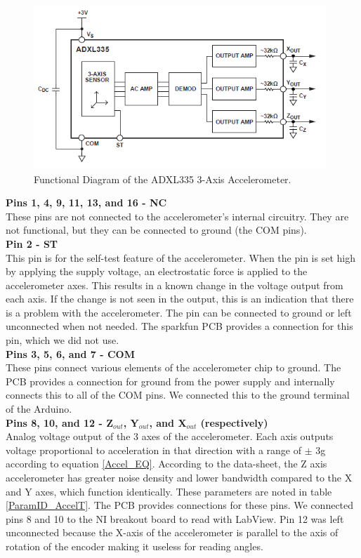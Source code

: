\documentclass{article}
\theoremstyle{plain}
\theoremstyle{definition}
\theoremstyle{remark}
\begin{document}
\begin{figure}[hbt]
\begin{center}
\includegraphics[width = 11cm]{ADXL335Functional.png}
\caption{Functional Diagram of the ADXL335 3-Axis Accelerometer.}
\label{accelFunc}
\end{center}
\end{figure}

\textbf{Pins 1, 4, 9, 11, 13, and 16 - NC}\\
These pins are not connected to the accelerometer's internal circuitry. They are not functional, but they can be connected to ground (the COM pins).\\

\textbf{ Pin 2 - ST}\\
This pin is for the self-test feature of the accelerometer. When the pin is set high by applying the supply voltage, an electrostatic force is applied to the accelerometer axes. This results in a known change in the voltage output from each axis. If the change is not seen in the output, this is an indication that there is a problem with the accelerometer. The pin can be connected to ground or left unconnected when not needed. The sparkfun PCB provides a connection for this pin, which we did not use.\\

\textbf{Pins 3, 5, 6, and 7 - COM}\\
These pins connect various elements of the accelerometer chip to ground. The PCB provides a connection for ground from the power supply and internally connects this to all of the COM pins. We connected this to the ground terminal of the Arduino.\\

\textbf{Pins 8, 10, and 12 - Z$_{out}$, Y$_{out}$, and X$_{out}$ (respectively)}\\ 
Analog voltage output of the 3 axes of the accelerometer. Each axis outputs voltage proportional to acceleration in that direction with a range of $\pm$ 3g according to equation \ref{Accel_EQ}.  According to the data-sheet, the Z axis accelerometer has greater noise density and lower bandwidth compared to the X and Y axes, which function identically. These parameters are noted in table \ref{ParamID_AccelT}.  The PCB provides connections for these pins. We connected pins 8 and 10 to the NI breakout board to read with LabView.  Pin 12 was left unconnected because the X-axis of the accelerometer is parallel to the axis of rotation of the encoder making it useless for reading angles.\\
\end{document}
